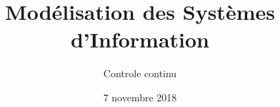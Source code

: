 \title{
    Modélisation des Systèmes d'Information
}
\author{
	Controle continu
}
\date{7 novembre 2018}
